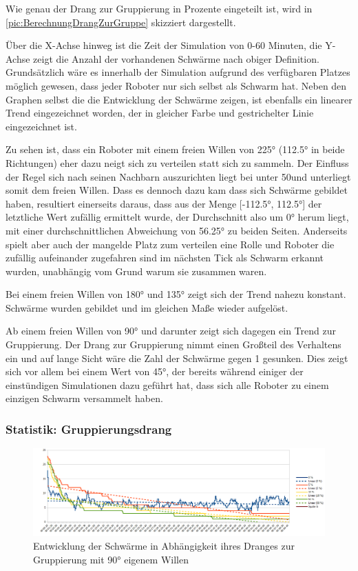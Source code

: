 Wie genau der Drang zur Gruppierung in Prozente eingeteilt ist, wird in \autoref{pic:BerechnungDrangZurGruppe} skizziert dargestellt.

Über die X-Achse hinweg ist die Zeit der Simulation von 0-60 Minuten, die Y-Achse zeigt die Anzahl der vorhandenen Schwärme nach obiger Definition. Grundsätzlich wäre es innerhalb der Simulation aufgrund des verfügbaren Platzes möglich gewesen, dass jeder Roboter nur sich selbst als Schwarm hat.
Neben den Graphen selbst die die Entwicklung der Schwärme zeigen, ist ebenfalls ein linearer Trend eingezeichnet worden, der in gleicher Farbe und gestrichelter Linie eingezeichnet ist.

Zu sehen ist, dass ein Roboter mit einem freien Willen von 225° (112.5° in beide Richtungen) eher dazu neigt sich zu verteilen statt sich zu sammeln. Der Einfluss der Regel sich nach seinen Nachbarn auszurichten liegt bei unter 50\per und unterliegt somit dem freien Willen. Dass es dennoch dazu kam dass sich Schwärme gebildet haben, resultiert einerseits daraus, dass aus der Menge [-112.5°, 112.5°] der letztliche Wert zufällig ermittelt wurde, der Durchschnitt also um 0° herum liegt, mit einer durchschnittlichen Abweichung von 56.25° zu beiden Seiten. Anderseits spielt aber auch der mangelde Platz zum verteilen eine Rolle und Roboter die zufällig aufeinander zugefahren sind im nächsten Tick als Schwarm erkannt wurden, unabhängig vom Grund warum sie zusammen waren.

Bei einem freien Willen von 180° und 135° zeigt sich der Trend nahezu konstant. Schwärme wurden gebildet und im gleichen Maße wieder aufgelöst.

Ab einem freien Willen von 90° und darunter zeigt sich dagegen ein Trend zur Gruppierung. Der Drang zur Gruppierung nimmt einen Großteil des Verhaltens ein und auf lange Sicht wäre die Zahl der Schwärme gegen 1 gesunken. Dies zeigt sich vor allem bei einem Wert von 45°, der bereits während einiger der einstündigen Simulationen dazu geführt hat, dass sich alle Roboter zu einem einzigen Schwarm versammelt haben.

\subsubsection*{Statistik: Gruppierungsdrang}

\begin{figure}
	\includegraphics[width=\textwidth, height=\statisticHeight]{graphics/Statistics/FlockGeneral/LocalRange1Speed01FreeWill90.png}
	\caption{Entwicklung der Schwärme in Abhängigkeit ihres Dranges zur Gruppierung mit 90° eigenem Willen}
	\label{pic:GeneralFlockStatistic2}
\end{figure}

